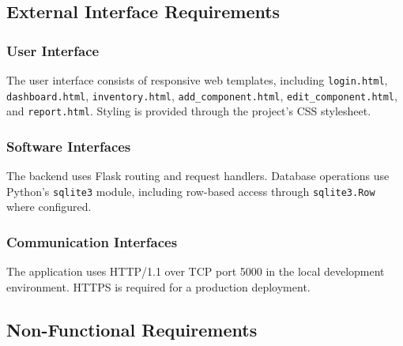 \documentclass[conference]{IEEEtran}
\begin{document}
\subsection{External Interface Requirements}

\subsubsection{User Interface}

The user interface consists of responsive web templates, including \texttt{login.html}, \texttt{dashboard.html}, \texttt{inventory.html}, \texttt{add\_component.html}, \texttt{edit\_component.html}, and \texttt{report.html}. Styling is provided through the project's CSS stylesheet.

\subsubsection{Software Interfaces}

The backend uses Flask routing and request handlers. Database operations use Python's \texttt{sqlite3} module, including row-based access through \texttt{sqlite3.Row} where configured.

\subsubsection{Communication Interfaces}

The application uses HTTP/1.1 over TCP port 5000 in the local development environment. HTTPS is required for a production deployment.

\subsection{Non-Functional Requirements}
\end{document}
